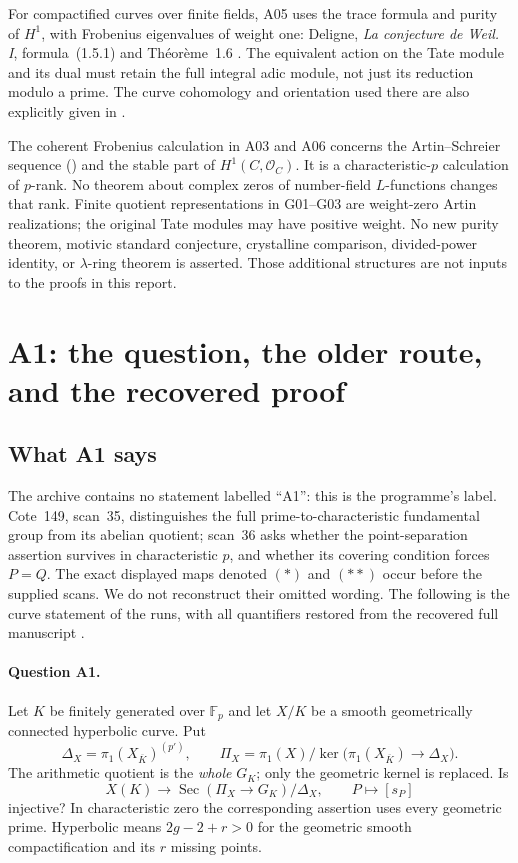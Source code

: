\documentclass[11pt,a4paper]{article}
\begin{document}
For compactified curves over finite fields, A05 uses the trace
formula and purity of $H^1$, with Frobenius eigenvalues of weight one:
Deligne, \emph{La conjecture de Weil. I}, formula~(1.5.1) and
Th\'eor\`eme~1.6 \cite{WeilI}. The equivalent action on the
Tate module and its dual must retain the full integral adic module,
not just its reduction modulo a prime. The curve cohomology and
orientation used there are also explicitly given in
\cite[Proposition~14.2 and Remark~14.10]{MilneLEC}.

The coherent Frobenius calculation in A03 and A06 concerns the
Artin--Schreier sequence (\cite[Example~7.9(b)]{MilneLEC}) and the stable part of $H^1(C,\mathcal O_C)$.
It is a characteristic-$p$ calculation of $p$-rank. No theorem about
complex zeros of number-field $L$-functions changes that rank.
Finite quotient representations in G01--G03 are weight-zero Artin
realizations; the original Tate modules may have positive weight.
No new purity theorem, motivic standard conjecture, crystalline
comparison, divided-power identity, or $\lambda$-ring theorem is
asserted. Those additional structures are not inputs to the proofs
in this report.


\section{A1: the question, the older route, and the recovered proof}
\label{sec:a1}

\subsection{What A1 says}
The archive contains no statement labelled ``A1'': this is the programme's
label. Cote~149, scan~35, distinguishes the full prime-to-characteristic
fundamental group from its abelian quotient; scan~36 asks whether the
point-separation assertion survives in characteristic $p$, and whether its
covering condition forces $P=Q$. The exact displayed maps denoted $(*)$ and
$(**)$ occur before the supplied scans. We do not reconstruct their omitted
wording. The following is the curve statement of the runs, with all
quantifiers restored from the recovered full manuscript
\cite[A.1, A.31--A.33]{A1run}.

\paragraph{Question A1.}
Let $K$ be finitely generated over $\mathbb F_p$ and let $X/K$ be a smooth
geometrically connected hyperbolic curve. Put
\[
 \Delta_X=\pi_1(X_{\overline K})^{(p')},\qquad
 \Pi_X=\pi_1(X)/\ker\bigl(\pi_1(X_{\overline K})\to\Delta_X\bigr).
\]
The arithmetic quotient is the \emph{whole} $G_K$; only the geometric
kernel is replaced. Is
\[
 X(K)\longrightarrow
 \operatorname{Sec}(\Pi_X\to G_K)/\Delta_X,
 \qquad P\longmapsto[s_P]
 \tag{A1}
\]
injective? In characteristic zero the corresponding assertion uses every
geometric prime. Hyperbolic means $2g-2+r>0$ for the geometric smooth
compactification and its $r$ missing points.
\end{document}
